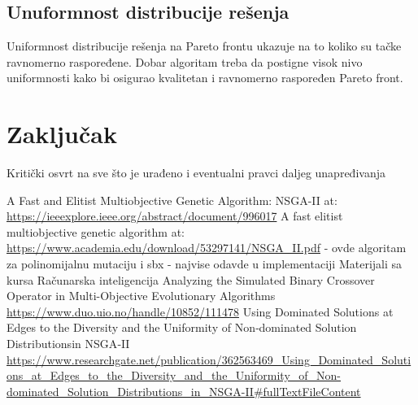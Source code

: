 \documentclass[12pt]{article}
\begin{document}

\subsection{Unuformnost distribucije rešenja}
Uniformnost distribucije rešenja na Pareto frontu ukazuje na to koliko su tačke ravnomerno raspoređene. Dobar algoritam treba da postigne visok nivo uniformnosti kako bi osigurao kvalitetan i ravnomerno raspoređen Pareto front.


\section{Zaključak}
Kritički osvrt na sve što je urađeno i eventualni pravci daljeg unapređivanja

\renewcommand{\refname}{Literatura}
\begin{thebibliography}{10}

 A Fast and Elitist Multiobjective Genetic Algorithm:
NSGA-II at:\\ \url{https://ieeexplore.ieee.org/abstract/document/996017} 
 A fast elitist multiobjective genetic algorithm at:\\ \url{https://www.academia.edu/download/53297141/NSGA_II.pdf} - ovde algoritam za polinomijalnu mutaciju i sbx - najvise odavde u implementaciji
 Materijali sa kursa Računarska inteligencija
 Analyzing the Simulated Binary Crossover Operator in Multi-Objective Evolutionary Algorithms\\ \url{https://www.duo.uio.no/handle/10852/111478} 
 Using Dominated Solutions at Edges to the Diversity and the Uniformity of Non‑dominated Solution Distributionsin NSGA‑II \url{https://www.researchgate.net/publication/362563469_Using_Dominated_Solutions_at_Edges_to_the_Diversity_and_the_Uniformity_of_Non-dominated_Solution_Distributions_in_NSGA-II#fullTextFileContent}


\end{thebibliography}
\end{document}

